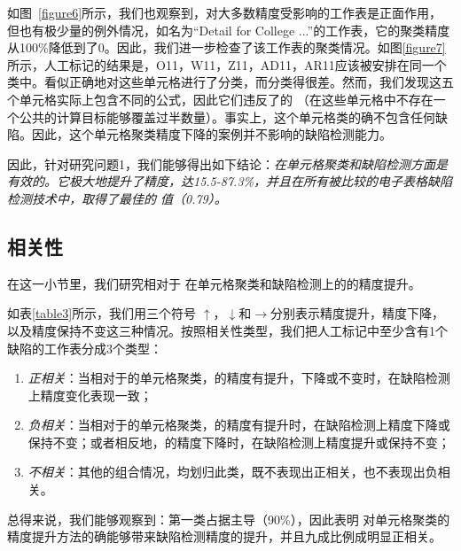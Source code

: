 


如图~\ref{figure6}所示，我们也观察到，\wa 对大多数精度受影响的工作表是正面作用，但也有极少量的例外情况，如名为“Detail for College ...”的工作表，它的聚类精度从100\%降低到了0。因此，我们进一步检查了该工作表的聚类情况。如图\ref{figure7}所示，人工标记的结果是，{O11，W11，Z11，AD11，AR11}应该被安排在同一个类中。\cu 看似正确地对这些单元格进行了分类，而\wa 分类得很差。然而，我们发现这五个单元格实际上包含不同的公式，因此它们违反了\wa 的 \wcvp （在这些单元格中不存在一个公共的计算目标能够覆盖过半数量）。事实上，这个单元格类的确不包含任何缺陷。因此，这个单元格聚类精度下降的案例并不影响\wa 的缺陷检测能力。

因此，针对研究问题1，我们能够得出如下结论：\textit{\wa 在单元格聚类和缺陷检测方面是有效的。它极大地提升了精度，达15.5-87.3\%，并且在所有被比较的电子表格缺陷检测技术中，取得了最佳的 \fmd 值（0.79）。}

\subsection{相关性}



在这一小节里，我们研究\wa 相对于 \cu 在单元格聚类和缺陷检测上的的精度提升。

如表\ref{table3}所示，我们用三个符号 $\uparrow$，$\downarrow$和$\to$分别表示精度提升，精度下降，以及精度保持不变这三种情况。按照相关性类型，我们把人工标记中至少含有1个缺陷的工作表分成3个类型：
\begin{enumerate}
    \item \textit{正相关}：当相对于\cu 的单元格聚类，\wa 的精度有提升，下降或不变时，在缺陷检测上精度变化表现一致；
    \item \textit{负相关}：当相对于\cu 的单元格聚类，\wa 的精度有提升时，在缺陷检测上精度下降或保持不变；或者相反地，\wa 的精度下降时，在缺陷检测上精度提升或保持不变；
    \item \textit{不相关}：其他的组合情况，均划归此类，既不表现出正相关，也不表现出负相关。
\end{enumerate}
总得来说，我们能够观察到：第一类占据主导（90\%），因此表明 \wa 对单元格聚类的精度提升方法的确能够带来缺陷检测精度的提升，并且九成比例成明显正相关。




